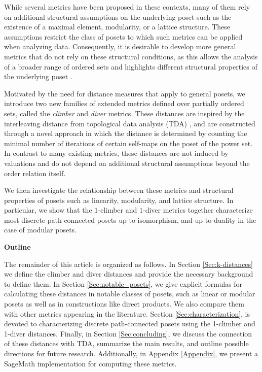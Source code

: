 \documentclass{article}[12pt]
\theoremstyle{exampstyle}
\theoremstyle{remark}
\begin{document}
While several metrics have been proposed in these contexts, many of them rely on additional structural assumptions on the underlying poset such as the existence of a maximal element, modularity, or a lattice structure. These assumptions restrict the class of posets to which such metrics can be applied when analyzing data. Consequently, it is desirable to develop more general metrics that do not rely on these structural conditions, as this allows the analysis of a broader range of ordered sets and highlights different structural properties of the underlying poset \cite{distances_agent_preferences}.


Motivated by the need for distance measures that apply to general posets, we introduce two new families of extended metrics defined over partially ordered sets, called the \textit{climber} and \textit{diver} metrics. These distances are inspired by the interleaving distance from topological data analysis (TDA) \cite{Flow}, and are constructed through a novel approach in which the distance is determined by counting the minimal number of iterations of certain self-maps on the poset of the power set. In contrast to many existing metrics, these distances are not induced by valuations and do not depend on additional structural assumptions beyond the order relation itself.

We then investigate the relationship between these metrics and structural properties of posets such as linearity, modularity, and lattice structure. In particular, we show that the $1$-climber and $1$-diver metrics together characterize most discrete path-connected posets up to isomorphism, and up to duality in the case of modular posets.

\textbf{Outline} 

The remainder of this article is organized as follows. In Section \ref{Sec:k-distances} we define the climber and diver distances and provide the necessary background to define them. In Section \ref{Sec:notable_posets}, we give explicit formulas for calculating these distances in notable classes of posets, such as linear or modular posets as well as in constructions like direct products. We also compare them with other metrics appearing in the literature. Section \ref{Sec:characterization}, is devoted to characterizing discrete path-connected posets using the 1-climber and 1-diver distances. Finally, in Section \ref{Sec:concluding}, we discuss the connection of these distances with TDA, summarize the main results, and outline possible directions for future research. Additionally, in Appendix \ref{Appendix}, we present a SageMath implementation for computing these metrics. 
\end{document}
